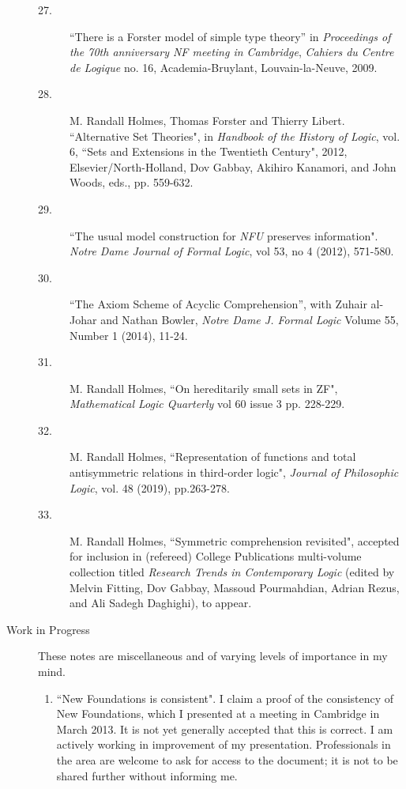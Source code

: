 \begin{description}
\begin{description}
\item[27.] ``There is a Forster model of simple type theory'' in {\em
Proceedings of the 70th anniversary NF meeting in Cambridge\/}, {\em
Cahiers du Centre de Logique\/} no. 16, Academia-Bruylant,
Louvain-la-Neuve, 2009.

\item[28.]
M. Randall Holmes, Thomas Forster and Thierry Libert. ``Alternative Set Theories",  in {\em Handbook of the History of Logic\/}, vol. 6, ``Sets and Extensions in the Twentieth Century", 2012, Elsevier/North-Holland, Dov Gabbay, Akihiro Kanamori, and John Woods, eds., pp. 559-632.

\item[29.] ``The usual model construction for {\em NFU\/} preserves information".  {\em Notre Dame Journal of Formal Logic\/}, vol 53, no 4 (2012), 571-580.

\item[30.]  ``The Axiom Scheme of Acyclic Comprehension'', with Zuhair al-Johar and Nathan Bowler, {\em Notre Dame J. Formal Logic\/}
Volume 55, Number 1 (2014), 11-24.

\item[31.]  M. Randall Holmes, ``On hereditarily small sets in ZF", {\em Mathematical Logic Quarterly\/}  vol 60 issue 3 pp. 228-229.

\item[32.]  M. Randall Holmes, ``Representation of functions and total antisymmetric relations in third-order logic", {\em Journal of Philosophic Logic\/}, vol. 48 (2019), pp.263-278.

\item[33.] M. Randall Holmes, ``Symmetric comprehension revisited", accepted for inclusion in (refereed) College Publications multi-volume collection titled {\em Research Trends in Contemporary Logic\/} (edited by Melvin Fitting, Dov Gabbay, Massoud Pourmahdian, Adrian Rezus, and Ali Sadegh Daghighi), to appear.


        \end{description}

\newpage

\item[Work in Progress]

These notes are miscellaneous and of varying levels of importance in my mind.

\begin{enumerate}

\item ``New Foundations is consistent".  I claim a proof of the consistency of New Foundations, which I presented at a meeting in Cambridge in March 2013.  It is not yet generally accepted that this is correct.  I am actively working in improvement of my presentation.   Professionals in the area are welcome to ask for access to the document; it is not to be shared further without informing me.


\end{enumerate}
\end{description}
